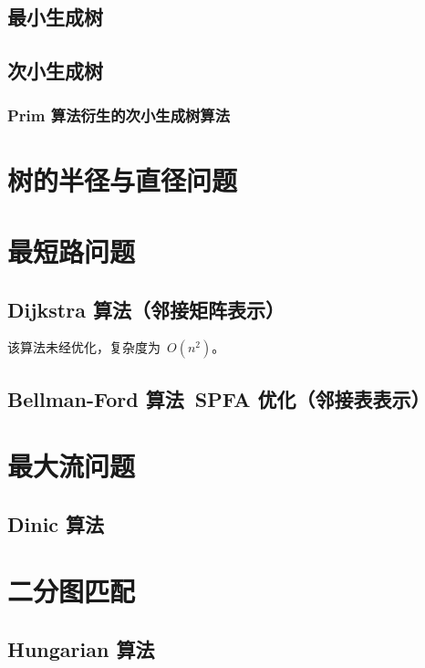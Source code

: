 \subsection{最小生成树}

\subsection{次小生成树}

\subsubsection{Prim 算法衍生的次小生成树算法}




\section{树的半径与直径问题}



\section{最短路问题}

\subsection{Dijkstra 算法（邻接矩阵表示）}

该算法未经优化，复杂度为~$O(n^2)$。



\subsection{Bellman-Ford 算法~SPFA 优化（邻接表表示）}




\section{最大流问题}

\subsection{Dinic 算法}




\section{二分图匹配}

\subsection{Hungarian 算法}


